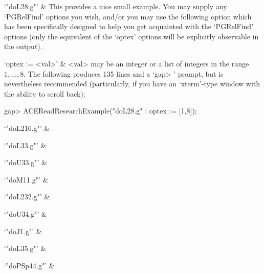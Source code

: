 \quad`"doL28.g"' &
This provides a nice small example. You  may  supply  any  `PGRelFind'
options you wish, and/or you may use the following  option  which  has
been specifically  designed  to  help  you  get  acquainted  with  the
`PGRelFind' options (only the equivalent of the `optex'  options  will
be explicitly observable in the output).

\qquad`optex := <val>' &
<val>  may  be  an  integer  or  a  list  of  integers  in  the  range
$1,\ldots,8$. The following produces 135 lines and a  `gap> '  prompt,
but  is  nevertheless  recommended  (particularly,  if  you  have   an
`xterm'-type window with the ability to scroll back):

\beginexample
gap> ACEReadResearchExample("doL28.g" : optex := [1,8]);  
\endexample

\quad`"doL216.g"' &

\quad`"doL33.g"' &

\quad`"doU33.g"' &

\quad`"doM11.g"' &

\quad`"doL232.g"' &

\quad`"doU34.g"' &

\quad`"doJ1.g"' &

\quad`"doL35.g"' &

\quad`"doPSp44.g"' &

\enditems

